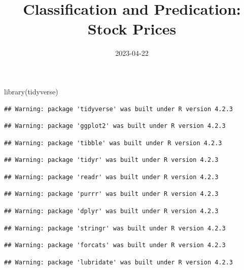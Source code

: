 \documentclass[
]{article}
\title{Classification and Predication: Stock Prices}
\author{}
\date{\vspace{-2.5em}2023-04-22}
\newenvironment{Shaded}{\begin{snugshade}}{\end{snugshade}}
\newcommand{\FunctionTok}[1]{\textcolor[rgb]{0.00,0.00,0.00}{#1}}
\newcommand{\NormalTok}[1]{#1}
\begin{document}
\maketitle

\begin{Shaded}
\begin{Highlighting}[]
\FunctionTok{library}\NormalTok{(tidyverse)}
\end{Highlighting}
\end{Shaded}

\begin{verbatim}
## Warning: package 'tidyverse' was built under R version 4.2.3
\end{verbatim}

\begin{verbatim}
## Warning: package 'ggplot2' was built under R version 4.2.3
\end{verbatim}

\begin{verbatim}
## Warning: package 'tibble' was built under R version 4.2.3
\end{verbatim}

\begin{verbatim}
## Warning: package 'tidyr' was built under R version 4.2.3
\end{verbatim}

\begin{verbatim}
## Warning: package 'readr' was built under R version 4.2.3
\end{verbatim}

\begin{verbatim}
## Warning: package 'purrr' was built under R version 4.2.3
\end{verbatim}

\begin{verbatim}
## Warning: package 'dplyr' was built under R version 4.2.3
\end{verbatim}

\begin{verbatim}
## Warning: package 'stringr' was built under R version 4.2.3
\end{verbatim}

\begin{verbatim}
## Warning: package 'forcats' was built under R version 4.2.3
\end{verbatim}

\begin{verbatim}
## Warning: package 'lubridate' was built under R version 4.2.3
\end{verbatim}
\end{document}
